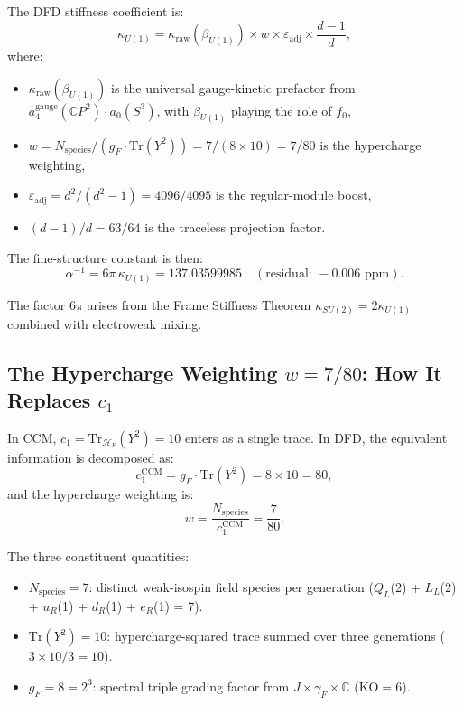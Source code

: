 \documentclass[12pt,a4paper]{article}
\begin{document}
The DFD stiffness coefficient is:
\begin{equation}\label{eq:kappa-master}
\boxed{
\kappa_{U(1)} = \kappa_{\mathrm{raw}}(\beta_{U(1)})
\times w \times \varepsilon_{\mathrm{adj}} \times \frac{d-1}{d},
}
\end{equation}
where:
\begin{itemize}[nosep]
\item $\kappa_{\mathrm{raw}}(\beta_{U(1)})$ is the universal gauge-kinetic
  prefactor from $a_4^{\mathrm{gauge}}(\mathbb{C}P^2) \cdot a_0(S^3)$,
  with $\beta_{U(1)}$ playing the role of $f_0$,
\item $w = N_{\mathrm{species}}/(g_F \cdot \mathrm{Tr}(Y^2))
  = 7/(8 \times 10) = 7/80$ is the hypercharge weighting,
\item $\varepsilon_{\mathrm{adj}} = d^2/(d^2-1) = 4096/4095$
  is the regular-module boost,
\item $(d-1)/d = 63/64$ is the traceless projection factor.
\end{itemize}

The fine-structure constant is then:
\begin{equation}\label{eq:alpha-master}
\boxed{
\alpha^{-1} = 6\pi\,\kappa_{U(1)} = 137.03599985
\quad (\text{residual: } {-}0.006\text{ ppm}).
}
\end{equation}

The factor $6\pi$ arises from the Frame Stiffness Theorem
$\kappa_{SU(2)} = 2\kappa_{U(1)}$ combined with electroweak mixing.

\subsection{The Hypercharge Weighting $w = 7/80$: How It Replaces $c_1$}

In CCM, $c_1 = \mathrm{Tr}_{\mathcal{H}_F}(Y^2) = 10$ enters as a single
trace.  In DFD, the equivalent information is decomposed as:
\begin{equation}
c_1^{\mathrm{CCM}} = g_F \cdot \mathrm{Tr}(Y^2) = 8 \times 10 = 80,
\end{equation}
and the hypercharge weighting is:
\begin{equation}
w = \frac{N_{\mathrm{species}}}{c_1^{\mathrm{CCM}}} = \frac{7}{80}.
\end{equation}

The three constituent quantities:
\begin{itemize}[nosep]
\item $N_{\mathrm{species}} = 7$: distinct weak-isospin field species per
  generation ($Q_L$(2) + $L_L$(2) + $u_R$(1) + $d_R$(1) + $e_R$(1) = 7).
\item $\mathrm{Tr}(Y^2) = 10$: hypercharge-squared trace summed over three
  generations ($3 \times 10/3 = 10$).
\item $g_F = 8 = 2^3$: spectral triple grading factor from
  $J \times \gamma_F \times \mathbb{C}$ ($\mathrm{KO} = 6$).
\end{itemize}
\end{document}
